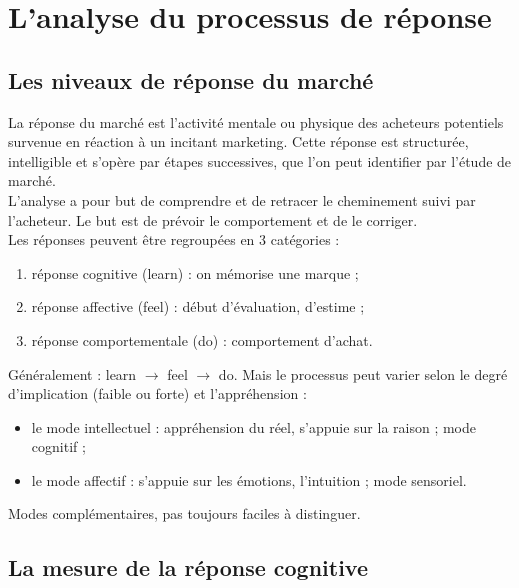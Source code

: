 

\chapter{L'analyse du processus de réponse}

	\section{Les niveaux de réponse du marché}

	La réponse du marché est l'activité mentale ou physique des acheteurs potentiels survenue en réaction à un incitant marketing. Cette réponse est structurée, intelligible et s'opère par étapes successives, que l'on peut identifier par l'étude de marché. \\

	L'analyse a pour but de comprendre et de retracer le cheminement suivi par l'acheteur. Le but est de prévoir le comportement et de le corriger. \\

	Les réponses peuvent être regroupées en 3 catégories :

	\begin{enumerate}
		\item réponse cognitive (learn) : on mémorise une marque ;
		\item réponse affective (feel) : début d'évaluation, d'estime ;
		\item réponse comportementale (do) : comportement d'achat.
	\end{enumerate}

	
	Généralement : learn $\rightarrow$ feel $\rightarrow$ do. Mais le processus peut varier selon le degré d'implication (faible ou forte) et l'appréhension :
	
	\begin{itemize}
		\item le mode intellectuel : appréhension du réel, s'appuie sur la raison ; mode cognitif ;
		\item le mode affectif : s'appuie sur les émotions, l'intuition ; mode sensoriel.
	\end{itemize}
	
	\n
	
	Modes complémentaires, pas toujours faciles à distinguer.
	
	
	
	\section{La mesure de la réponse cognitive}


